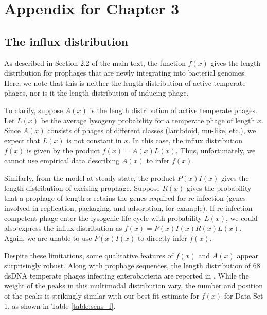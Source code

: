 \chapter{Appendix for Chapter 3}\label{AppC}
\section{The influx distribution}
As described in Section 2.2 of the main text, the function $f(x)$ gives the length distribution for prophages that are newly integrating into bacterial genomes.  Here, we note that this is neither the length distribution of active temperate phages, nor is it the length distribution of inducing phage.

To clarify, suppose $A(x)$ is the length distribution of active temperate phages. Let $L(x)$ be the average lysogeny probability for a temperate phage of length $x$.  Since $A(x)$ consists of phages of different classes (lambdoid, mu-like, etc.), we expect that $L(x)$ is not constant in $x$.  In this case, the influx distribution  $f(x)$ is given by
the product $f(x) = A(x)L(x)$.  Thus, unfortunately, we cannot use empirical data describing $A(x)$ to infer $f(x)$.

Similarly, from the model at steady state, the product $P(x)I(x)$ gives the length distribution of excising prophage.  Suppose $R(x)$ gives the probability that a prophage of length $x$ retains the genes required for re-infection (genes involved in replication, packaging, and adsorption, for example).  If re-infection competent phage enter the lysogenic life cycle with probability $L(x)$, we could also express the influx distribution as $f(x) = P(x)I(x)R(x)L(x)$.  Again, we are unable to use $P(x)I(x)$ to directly infer $f(x)$.

Despite these limitations, some qualitative features of $f(x)$ and $A(x)$ appear surprisingly robust.  Along with prophage sequences, the length distribution of 68 dsDNA temperate phages infecting enterobacteria are reported in \cite{bobay_pervasive_2014}.  While the weight of the peaks in this multimodal distribution vary, the number and position of the peaks is strikingly similar with our best fit estimate for $f(x)$ for Data Set 1, as shown in Table \ref{table:sens_f}.

